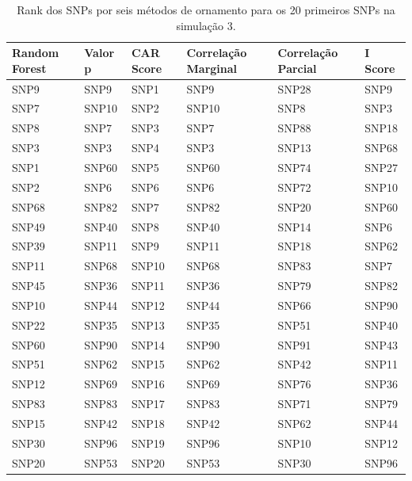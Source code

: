 \begin{table}[ht]
\centering
\begin{tabular}{llllll}
  \hline
Random Forest & Valor p & CAR Score & Correlação Marginal & Correlação Parcial & I Score \\ 
  \hline
SNP9 & SNP9 & SNP1 & SNP9 & SNP28 & SNP9 \\ 
  SNP7 & SNP10 & SNP2 & SNP10 & SNP8 & SNP3 \\ 
  SNP8 & SNP7 & SNP3 & SNP7 & SNP88 & SNP18 \\ 
  SNP3 & SNP3 & SNP4 & SNP3 & SNP13 & SNP68 \\ 
  SNP1 & SNP60 & SNP5 & SNP60 & SNP74 & SNP27 \\ 
  SNP2 & SNP6 & SNP6 & SNP6 & SNP72 & SNP10 \\ 
  SNP68 & SNP82 & SNP7 & SNP82 & SNP20 & SNP60 \\ 
  SNP49 & SNP40 & SNP8 & SNP40 & SNP14 & SNP6 \\ 
  SNP39 & SNP11 & SNP9 & SNP11 & SNP18 & SNP62 \\ 
  SNP11 & SNP68 & SNP10 & SNP68 & SNP83 & SNP7 \\ 
  SNP45 & SNP36 & SNP11 & SNP36 & SNP79 & SNP82 \\ 
  SNP10 & SNP44 & SNP12 & SNP44 & SNP66 & SNP90 \\ 
  SNP22 & SNP35 & SNP13 & SNP35 & SNP51 & SNP40 \\ 
  SNP60 & SNP90 & SNP14 & SNP90 & SNP91 & SNP43 \\ 
  SNP51 & SNP62 & SNP15 & SNP62 & SNP42 & SNP11 \\ 
  SNP12 & SNP69 & SNP16 & SNP69 & SNP76 & SNP36 \\ 
  SNP83 & SNP83 & SNP17 & SNP83 & SNP71 & SNP79 \\ 
  SNP15 & SNP42 & SNP18 & SNP42 & SNP62 & SNP44 \\ 
  SNP30 & SNP96 & SNP19 & SNP96 & SNP10 & SNP12 \\ 
  SNP20 & SNP53 & SNP20 & SNP53 & SNP30 & SNP96 \\ 
   \hline
\end{tabular}
\caption{Rank dos SNPs por seis métodos de ornamento para os 20 primeiros SNPs na simulação 3.} 
\label{tab:ranks}
\end{table}
